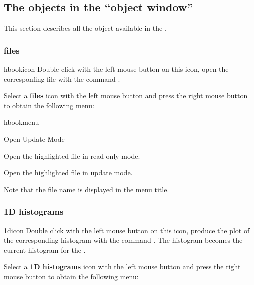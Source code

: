 \subsection{The objects in the ``object window''}
This section describes all the \PAWPP{} object available in the \MB{}.

\subsubsection{\HBOOK{} files}
\begin{ICON}{hbookicon}
Double click with the left mouse button on this icon, open the corresponfing
\HBOOK{} file with the command .
\end{ICON}

Select a {\bf \HBOOK{} files} icon with the left mouse button and press
the right mouse button to obtain the following menu:

\begin{PAWf}{hbookmenu}
\begin{DLsf}{Open Update Mode}
\item[Open]              Open the highlighted \HBOOK{} file in read-only mode.
\item[Open Update Mode]  Open the highlighted \HBOOK{} file in update mode.
\end{DLsf}
\end{PAWf}

Note that the \HBOOK{} file name is displayed in the menu title.


\subsubsection{1D histograms}
\begin{ICON}{1dicon}
Double click with the left mouse button on this icon, produce the plot of the
corresponding histogram with the command  . The histogram
becomes the current histogram for the \HSP.
\end{ICON}

Select a {\bf 1D histograms} icon with the left mouse button and press
the right mouse button to obtain the following menu:

